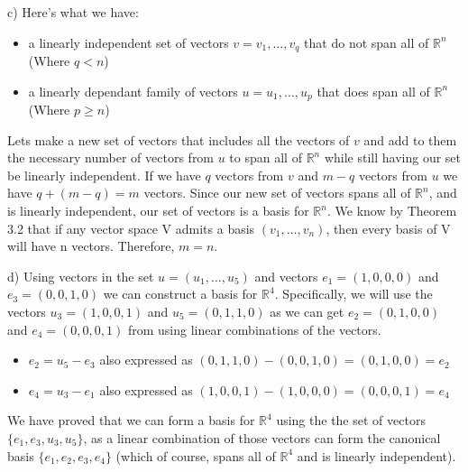 \documentclass{article}
\begin{document}
\par
c) Here's what we have:
\begin{itemize}
    \item a linearly independent set of vectors $v = {v_1,\dots, v_q}$ that do not span all of $\mathbb{R}^n$ (Where $q<n$)
    \item a linearly dependant family of vectors $u = {u_1, \dots, u_p}$ that does span all of $\mathbb{R}^n$ (Where $p\geq n$)
\end{itemize}
Lets make a new set of vectors that includes all the vectors of $v$ and add to them the necessary number of vectors from $u$ to span all of $\mathbb{R}^n$ while still having our set be linearly independent. If we have $q$ vectors from $v$ and $m-q$ vectors from $u$ we have $q+(m-q)=m$ vectors. Since our new set of vectors spans all of $\mathbb{R}^n$, and is linearly independent, our set of vectors is a basis for $\mathbb{R}^n$. We know by Theorem 3.2 that if any vector space V admits a basis $(v_1,\dots,v_n)$, then every basis of V will have n vectors. Therefore, $m=n$.
\par

d) Using vectors in the set $u = (u_1, \dots, u_5)$ and vectors $e_1 = (1,0,0,0)$ and $e_3 = (0,0,1,0)$ we can construct a basis for $\mathbb{R}^4$. Specifically, we will use the vectors $u_3 = (1,0,0,1)$ and $u_5 = (0,1,1,0)$ as we can get $e_2 = (0,1,0,0)$ and $e_4 = (0,0,0,1)$ from using linear combinations of the vectors. 

\begin{itemize}
    \item $e_2 = u_5 - e_3$ also expressed as  $(0,1,1,0)-(0,0,1,0) = (0,1,0,0) = e_2$   
    \item $e_4 = u_3 - e_1$ also expressed as  $(1,0,0,1)-(1,0,0,0) = (0,0,0,1) = e_4$  
\end{itemize}
We have proved that we can form a basis for $\mathbb{R}^4$ using the the set of vectors $\{e_1,e_3,u_3,u_5\}$, as a linear combination of those vectors can form the canonical basis $\{e_1,e_2,e_3,e_4\}$ (which of course, spans all of $\mathbb{R}^4$ and is linearly independent).

\break
\end{document}
